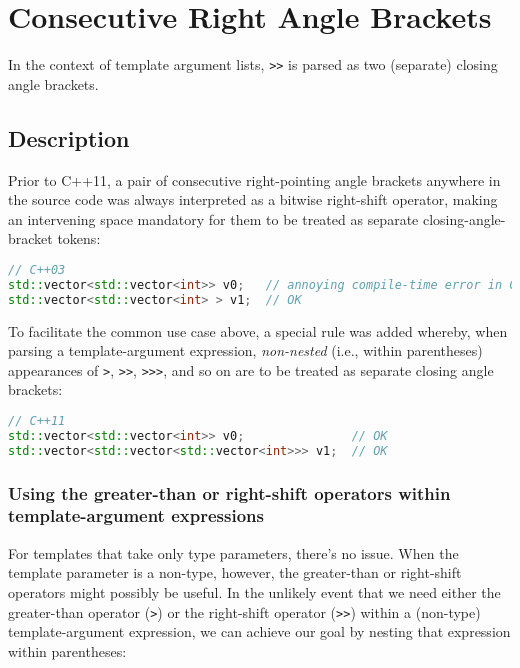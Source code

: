 \newpage
\section[Consecutive Right Angle Brackets]{Consecutive Right Angle Brackets}\label{consecutive-right-angle-brackets}
In the context of template argument lists, \texttt{>>} is parsed as two
(separate) closing angle brackets.

\subsection[Description]{Description}\label{description}

Prior to C++11, a pair of consecutive right-pointing angle brackets anywhere in
the source code was always interpreted as a bitwise right-shift
operator, making an intervening space mandatory for them to be treated
as separate closing-angle-bracket tokens:

\begin{lstlisting}[language=C++]
// C++03
std::vector<std::vector<int>> v0;   // annoying compile-time error in C++03
std::vector<std::vector<int> > v1;  // OK
\end{lstlisting}

\noindent To facilitate the common use case above, a special rule was added
whereby, when parsing a template-argument expression, \emph{non-nested}
(i.e., within parentheses) appearances of \texttt{>}, \texttt{>>},
\texttt{>>>}, and so on are to be treated as separate closing angle brackets:

\begin{lstlisting}[language=C++]
// C++11
std::vector<std::vector<int>> v0;               // OK
std::vector<std::vector<std::vector<int>>> v1;  // OK
\end{lstlisting}

\subsubsection[Using the greater-than or right-shift operators within template-argument expressions]{Using the greater-than or right-shift operators within template-argument expressions}\label{using-the-greater-than-or-right-shift-operators-within-template-argument-expressions}

For templates that take only type parameters, there's no issue. When the
template parameter is a non-type, however, the greater-than or right-shift operators might possibly be
useful. In the unlikely event that we need either the greater-than
operator (\texttt{>}) or the right-shift operator (\texttt{>>}) within a
(non-type) template-argument expression, we can achieve our goal by
nesting that expression within parentheses:

